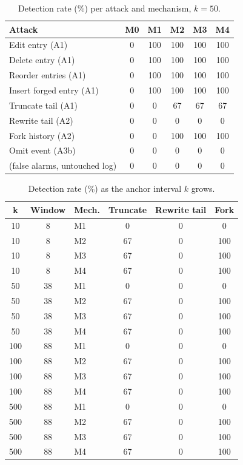 \begin{table}[t]
\caption{Detection rate (\%) per attack and mechanism, $k=50$.}
\label{tab:detection}
\centering
\begin{tabular}{lccccc}
\hline
Attack & M0 & M1 & M2 & M3 & M4 \\
\hline
Edit entry (A1) & 0 & 100 & 100 & 100 & 100 \\
Delete entry (A1) & 0 & 100 & 100 & 100 & 100 \\
Reorder entries (A1) & 0 & 100 & 100 & 100 & 100 \\
Insert forged entry (A1) & 0 & 100 & 100 & 100 & 100 \\
Truncate tail (A1) & 0 & 0 & 67 & 67 & 67 \\
Rewrite tail (A2) & 0 & 0 & 0 & 0 & 0 \\
Fork history (A2) & 0 & 0 & 100 & 100 & 100 \\
Omit event (A3b) & 0 & 0 & 0 & 0 & 0 \\
(false alarms, untouched log) & 0 & 0 & 0 & 0 & 0 \\
\hline
\end{tabular}
\end{table}

\begin{table}[t]
\caption{Detection rate (\%) as the anchor interval $k$ grows.}
\label{tab:sweep}
\centering
\begin{tabular}{cclccc}
\hline
k & Window & Mech. & Truncate & Rewrite tail & Fork \\
\hline
10 & 8 & M1 & 0 & 0 & 0 \\
10 & 8 & M2 & 67 & 0 & 100 \\
10 & 8 & M3 & 67 & 0 & 100 \\
10 & 8 & M4 & 67 & 0 & 100 \\
50 & 38 & M1 & 0 & 0 & 0 \\
50 & 38 & M2 & 67 & 0 & 100 \\
50 & 38 & M3 & 67 & 0 & 100 \\
50 & 38 & M4 & 67 & 0 & 100 \\
100 & 88 & M1 & 0 & 0 & 0 \\
100 & 88 & M2 & 67 & 0 & 100 \\
100 & 88 & M3 & 67 & 0 & 100 \\
100 & 88 & M4 & 67 & 0 & 100 \\
500 & 88 & M1 & 0 & 0 & 0 \\
500 & 88 & M2 & 67 & 0 & 100 \\
500 & 88 & M3 & 67 & 0 & 100 \\
500 & 88 & M4 & 67 & 0 & 100 \\
\hline
\end{tabular}
\end{table}

